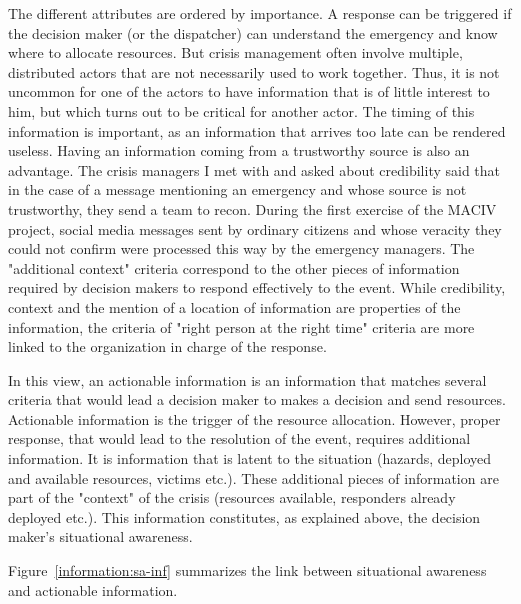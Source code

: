 The different attributes are ordered by importance.
A response can be triggered if the decision maker (or the dispatcher) can understand the emergency
and know where to allocate resources.
But crisis management often involve multiple, distributed actors that are not necessarily
used to work together.
Thus, it is not uncommon for one of the actors to have information that is of little interest to him,
but which turns out to be critical for another actor.
The timing of this information is important, as an information that arrives too late can be rendered useless.
Having an information coming from a trustworthy source is also an advantage.
The crisis managers I met with and asked about credibility said that in the case of a message
mentioning an emergency and whose source is not trustworthy, they send a team to recon.
During the first exercise of the MACIV project,  social media messages sent by ordinary
citizens and whose veracity they could not confirm were processed this way by the emergency managers.
The "additional context" criteria correspond to the other pieces of information required
by decision makers to respond effectively to the event.
While credibility, context and the mention of a location of information are properties of
the information, the criteria of "right person at the right time" criteria are more linked
to the organization in charge of the response.

In this view, an actionable information is an information that matches several criteria
that would lead a decision maker to makes a decision and send resources.
Actionable information is the trigger of the resource allocation.
However, proper response, that would lead to the resolution of the event, requires additional
information.
It is information that is latent to the situation (hazards, deployed and available resources, victims etc.).
These additional pieces of information are part of the "context" of the crisis (resources available,
responders already deployed etc.).
This information constitutes, as explained above, the decision maker's situational awareness.

Figure~\ref{information:sa-inf} summarizes the link between situational awareness and actionable information.

